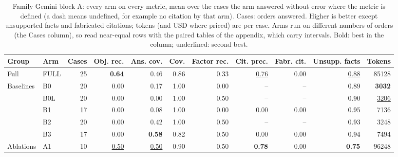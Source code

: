 \begin{table}[t]
\centering\footnotesize
\begin{adjustbox}{max width=\textwidth}
\begin{tabular}{@{}llrrrrrrrrr@{}}
\toprule
Group & Arm & Cases & Obj. rec. & Ans. cov. & Cov. & Factor rec. & Cit. prec. & Fabr. cit. & Unsupp. facts & Tokens \\
\midrule
Full & FULL & 25 & \textbf{0.64} & 0.46 & 0.86 & 0.33 & \underline{0.76} & 0.00 & \underline{0.88} & 85128 \\
\midrule
Baselines & B0 & 20 & 0.00 & 0.17 & 1.00 & 0.00 & -- & -- & 0.89 & \textbf{3032} \\
 & B0L & 20 & 0.00 & 0.00 & 1.00 & 0.50 & -- & -- & 0.90 & \underline{3206} \\
 & B1 & 17 & 0.00 & 0.08 & 1.00 & 0.00 & 0.00 & 0.00 & 0.95 & 7136 \\
 & B2 & 20 & 0.00 & 0.42 & 1.00 & 0.50 & -- & -- & 0.93 & 3248 \\
 & B3 & 17 & 0.00 & \textbf{0.58} & 0.82 & 0.50 & 0.00 & 0.00 & 0.94 & 7494 \\
\midrule
Ablations & A1 & 10 & \underline{0.50} & \underline{0.50} & 0.90 & 0.50 & \textbf{0.78} & 0.00 & \textbf{0.75} & 96248 \\
\bottomrule
\end{tabular}
\end{adjustbox}
\caption{Family Gemini block A: every arm on every metric, mean over the cases the arm answered without error where the metric is defined (a dash means undefined, for example no citation by that arm). Cases: orders answered. Higher is better except unsupported facts and fabricated citations; tokens (and USD where priced) are per case. Arms run on different numbers of orders (the Cases column), so read near-equal rows with the paired tables of the appendix, which carry intervals. Bold: best in the column; underlined: second best.}
\label{tab:master_gemini}
\end{table}
